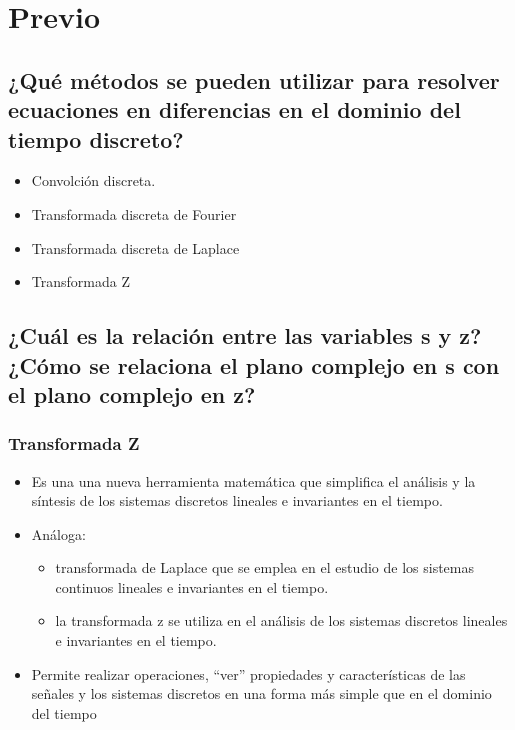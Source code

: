 \section{Previo}

\noindent \justifying


\subsection{¿Qué métodos se pueden utilizar para resolver ecuaciones en diferencias en el dominio del tiempo discreto?} 

\begin{itemize}
	\item Convolción discreta.
	\item Transformada discreta de Fourier
	\item Transformada discreta de Laplace
	\item Transformada Z
\end{itemize} 


\subsection{¿Cuál es la relación entre las variables s y z? ¿Cómo se relaciona el plano complejo en s con el plano complejo en z?}


\subsubsection{Transformada Z}

\begin{itemize}
	\item Es una una nueva herramienta matemática que simplifica el análisis y la síntesis de los sistemas discretos lineales e invariantes en el tiempo.
	\item Análoga: \begin{itemize}
		\item  transformada de Laplace que se emplea en el estudio de los sistemas continuos lineales
		e invariantes en el tiempo.
		\item la transformada z se utiliza en el análisis de los sistemas discretos lineales e invariantes en el tiempo.
	\end{itemize}
	\item Permite realizar operaciones, “ver” propiedades y características de
	las señales y los sistemas discretos en una forma más simple que en el dominio del tiempo
\end{itemize}

